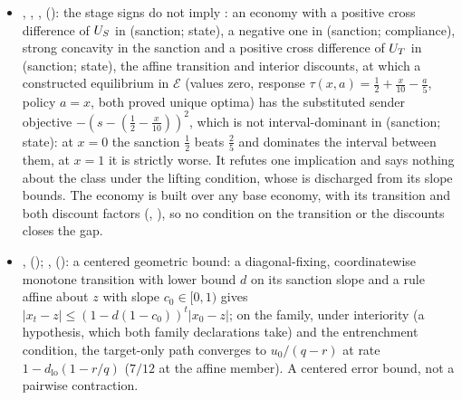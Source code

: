 \begin{itemize}[leftmargin=1.4em,itemsep=1pt]
\item {}, , ,  (): the stage signs do not imply : an economy with a positive cross difference of $U_S$ in (sanction; state), a negative one in (sanction; compliance), strong concavity in the sanction and a positive cross difference of $U_T$ in (sanction; state), the affine transition and interior discounts, at which a constructed equilibrium in $\mathcal E$ (values zero, response $\tau(x,a)=\tfrac12+\tfrac{x}{10}-\tfrac a5$, policy $a=x$, both proved unique optima) has the substituted sender objective $-(s-(\tfrac12-\tfrac{x}{10}))^2$, which is not interval-dominant in (sanction; state): at $x=0$ the sanction $\tfrac12$ beats $\tfrac25$ and dominates the interval between them, at $x=1$ it is strictly worse. It refutes one implication and says nothing about the class under the lifting condition, whose  is discharged from its slope bounds. The economy is built over any base economy, with its transition and both discount factors (, ), so no condition on the transition or the discounts closes the gap.
\item {},  (); ,  (): a centered geometric bound: a diagonal-fixing, coordinatewise monotone transition with lower bound $d$ on its sanction slope and a rule affine about $z$ with slope $c_0\in[0,1)$ gives $|x_t-z|\le(1-d(1-c_0))^t|x_0-z|$; on the family, under interiority (a hypothesis, which both family declarations take) and the entrenchment condition, the target-only path converges to $u_0/(q-r)$ at rate $1-d_{\mathrm{lo}}(1-r/q)$ ($7/12$ at the affine member). A centered error bound, not a pairwise contraction.

\end{itemize}
